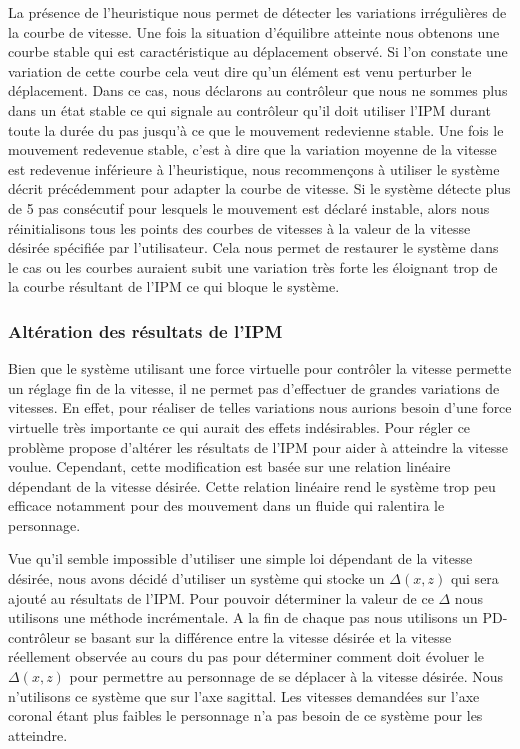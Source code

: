 \documentclass{llncs}
\begin{document}
La présence de l'heuristique nous permet de détecter les variations irrégulières de la courbe de vitesse. Une fois la situation d'équilibre atteinte nous obtenons une courbe stable qui est caractéristique au déplacement observé. Si l'on constate une variation de cette courbe cela veut dire qu'un élément est venu perturber le déplacement. Dans ce cas, nous déclarons au contrôleur que nous ne sommes plus dans un état stable ce qui signale au contrôleur qu'il doit utiliser l'IPM durant toute la durée du pas jusqu'à ce que le mouvement redevienne stable. Une fois le mouvement redevenue stable, c'est à dire que la variation moyenne de la vitesse est redevenue inférieure à l'heuristique, nous recommençons à utiliser le système décrit précédemment pour adapter la courbe de vitesse. Si le système détecte plus de 5 pas consécutif pour lesquels le mouvement est déclaré instable, alors nous réinitialisons tous les points des courbes de vitesses à la valeur de la vitesse désirée spécifiée par l'utilisateur. Cela nous permet de restaurer le système dans le cas ou les courbes auraient subit une variation très forte les éloignant trop de la courbe résultant de l'IPM ce qui bloque le système.
%
\subsubsection{Altération des résultats de l'IPM}
\label{sec:ipm_alt}
%
Bien que le système utilisant une force virtuelle pour contrôler la vitesse permette un réglage fin de la vitesse, il ne permet pas d'effectuer de grandes variations de vitesses. En effet, pour réaliser de telles variations nous aurions besoin d'une force virtuelle très importante ce qui aurait des effets indésirables.
Pour régler ce problème \cite{coros2010generalized} propose d'altérer les résultats de l'IPM pour aider à atteindre la vitesse voulue. Cependant, cette modification est basée sur une relation linéaire dépendant de la vitesse désirée. Cette relation linéaire rend le système trop peu efficace notamment pour des mouvement dans un fluide qui ralentira le personnage.

Vue qu'il semble impossible d'utiliser une simple loi dépendant de la vitesse désirée, nous avons décidé d'utiliser un système qui stocke un $\Delta(x,z)$ qui sera ajouté au résultats de l'IPM. Pour pouvoir déterminer la valeur de ce $\Delta$ nous utilisons une méthode incrémentale. A la fin de chaque pas nous utilisons un PD-contrôleur se basant sur la différence entre la vitesse désirée et la vitesse réellement observée au cours du pas pour déterminer comment doit évoluer le $\Delta(x,z)$ pour permettre au personnage de se déplacer à la vitesse désirée. Nous n'utilisons ce système que sur l'axe sagittal. Les vitesses demandées sur l'axe coronal étant plus faibles le personnage n'a pas besoin de ce système pour les atteindre.
\end{document}
